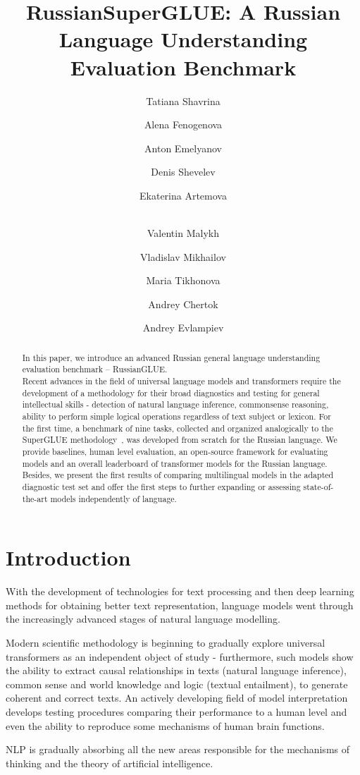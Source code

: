 \documentclass[11pt,a4paper]{article}
\title{RussianSuperGLUE: A Russian Language Understanding Evaluation Benchmark}
\author[1,2]{Tatiana Shavrina}
\author[1]{Alena Fenogenova}
\author[1,3]{Anton Emelyanov}
\author[1]{Denis Shevelev}
\author[2]{Ekaterina Artemova}
\author[4]{\\Valentin Malykh}
\author[1,2]{Vladislav Mikhailov}
\author[1,2]{Maria Tikhonova}
\author[1]{Andrey Chertok}
\author[1]{Andrey Evlampiev}
\affil[1]{Sberbank / Moscow, Russia}
\affil[2]{National Research University  Higher School of Economics / Moscow, Russia}
\affil[3]{Moscow Institute of Physics and Technology / Moscow, Russia}
\affil[4]{Huawei  Noah’s Ark lab/ Moscow, Russia}
\date{}
\begin{document}
\maketitle
\begin{abstract}
In this paper, we introduce an advanced Russian general language understanding evaluation benchmark -- RussianGLUE.  \\
Recent advances in the field of universal language models and transformers require the development of a methodology for their broad diagnostics and testing for general intellectual skills - detection of natural language inference, commonsense reasoning, ability to perform simple logical operations regardless of text subject or lexicon. For the first time, a benchmark of nine tasks, collected and organized analogically to the SuperGLUE methodology~\cite{wang2019superglue}, was developed from scratch for the Russian language. We provide baselines, human level evaluation,  an open-source framework for evaluating models and an overall leaderboard of transformer models for the Russian language.\\
Besides, we present the first results of comparing multilingual models in the adapted diagnostic test set and offer the first steps to further expanding or assessing state-of-the-art models independently of language.

\end{abstract}


\section{Introduction} \label{sec:intro}

With the development of technologies for text processing and then deep learning methods for obtaining better text representation, language models went through the increasingly advanced stages of natural language modelling. 

Modern scientific methodology is beginning to gradually explore universal transformers as an independent object of study - furthermore, such models show the ability to extract causal relationships in texts (natural language inference), common sense and world knowledge and logic (textual entailment), to generate coherent and correct texts. An actively developing field of model interpretation develops testing procedures comparing their performance to a human level and even the ability to reproduce some mechanisms of human brain functions.

NLP is gradually absorbing all the new areas responsible for the mechanisms of thinking and the theory of artificial intelligence.
\end{document}
